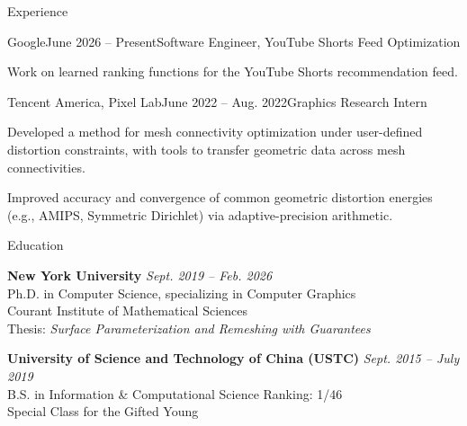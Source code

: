 \documentclass{resume} %
\begin{document}

\begin{rSection}{Experience}

\begin{rSubsection}{Google}{June 2026 -- Present}{Software Engineer, YouTube Shorts Feed Optimization}{}
\item Work on learned ranking functions for the YouTube Shorts recommendation feed.
\end{rSubsection}

\begin{rSubsection}{Tencent America, Pixel Lab}{June 2022 -- Aug. 2022}{Graphics Research Intern}{}
\item Developed a method for mesh connectivity optimization under user-defined distortion constraints, with tools to transfer geometric data across mesh connectivities.
\item Improved accuracy and convergence of common geometric distortion energies (e.g., AMIPS, Symmetric Dirichlet) via adaptive-precision arithmetic.
\end{rSubsection}

\end{rSection}


\begin{rSection}{Education}

{\bf New York University} \hfill {\em Sept. 2019 -- Feb. 2026}\\
Ph.D. in Computer Science, specializing in Computer Graphics \hfill \\
Courant Institute of Mathematical Sciences \\
Thesis: {\em Surface Parameterization and Remeshing with Guarantees}

{\bf University of Science and Technology of China (USTC)} \hfill {\em Sept. 2015 -- July 2019}\\
B.S. in Information \& Computational Science \hfill Ranking: 1/46\\
Special Class for the Gifted Young

\end{rSection}
\end{document}
